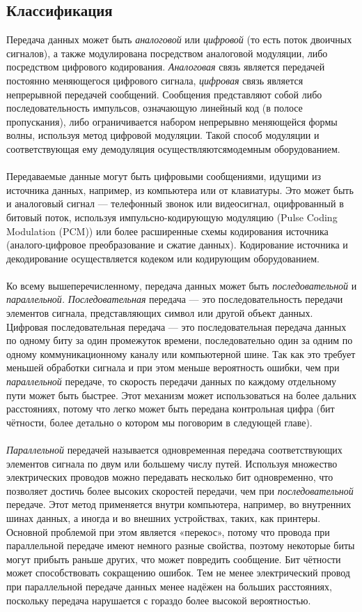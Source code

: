 \subsection{Классификация}
Передача данных может быть \emph{аналоговой} или \emph{цифровой} (то есть поток двоичных сигналов), а также модулирована посредством аналоговой модуляции, либо посредством цифрового кодирования. \emph{Аналоговая} связь является передачей постоянно меняющегося цифрового сигнала, \emph{цифровая} связь является непрерывной передачей сообщений. Сообщения представляют собой либо последовательность импульсов, означающую линейный код (в полосе пропускания), либо ограничивается набором непрерывно меняющейся формы волны, используя метод цифровой модуляции. Такой способ модуляции и соответствующая ему демодуляция осуществляютсямодемным оборудованием.\\
\\Передаваемые данные могут быть цифровыми сообщениями, идущими из источника данных, например, из компьютера или от клавиатуры. Это может быть и аналоговый сигнал — телефонный звонок или видеосигнал, оцифрованный в битовый поток, используя импульсно-кодирующую модуляцию (Pulse Coding Modulation (PCM)) или более расширенные схемы кодирования источника (аналого-цифровое преобразование и сжатие данных). Кодирование источника и декодирование осуществляется кодеком или кодирующим оборудованием.\\
\\ Ко всему вышеперечисленному, передача данных может быть \emph{последовательной} и \emph{параллельной.} \emph{Последовательная} передача — это последовательность передачи элементов сигнала, представляющих символ или другой объект данных. Цифровая последовательная передача — это последовательная передача данных по одному биту за один промежуток времени, последовательно один за одним по одному коммуникационному каналу или компьютерной шине. Так как это требует меньшей обработки сигнала и при этом меньше вероятность ошибки, чем при \emph{параллельной} передаче, то скорость передачи данных по каждому отдельному пути может быть быстрее. Этот механизм может использоваться на более дальних расстояниях, потому что легко может быть передана контрольная цифра (бит чётности, более детально о котором мы поговорим в следующей главе).\\
\\\emph{Параллельной} передачей называется одновременная передача соответствующих элементов сигнала по двум или большему числу путей. Используя множество электрических проводов можно передавать несколько бит одновременно, что позволяет достичь более высоких скоростей передачи, чем при \emph{последовательной} передаче. Этот метод применяется внутри компьютера, например, во внутренних шинах данных, а иногда и во внешних устройствах, таких, как принтеры. Основной проблемой при этом является «перекос», потому что провода при параллельной передаче имеют немного разные свойства, поэтому некоторые биты могут прибыть раньше других, что может повредить сообщение. Бит чётности может способствовать сокращению ошибок. Тем не менее электрический провод при параллельной передаче данных менее надёжен на больших расстояниях, поскольку передача нарушается с гораздо более высокой вероятностью.
